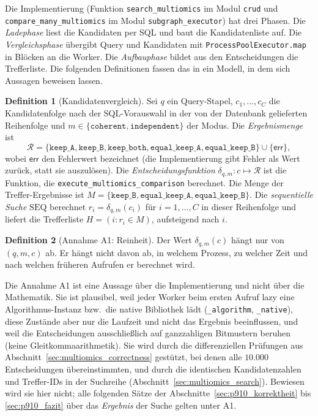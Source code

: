 \documentclass[a4paper,12pt, twoside]{report}
\theoremstyle{definition}
\newtheorem{definition}{Definition}
\begin{document}
Die Implementierung (Funktion \texttt{search\_multiomics} im Modul \texttt{crud} und \texttt{compare\_many\_multiomics} im Modul \texttt{subgraph\_executor}) hat drei Phasen. Die \emph{Ladephase} liest die Kandidaten per SQL und baut die Kandidatenliste auf. Die \emph{Vergleichsphase} übergibt Query und Kandidaten mit \texttt{ProcessPoolExecutor.map} in Blöcken an die Worker. Die \emph{Aufbauphase} bildet aus den Entscheidungen die Trefferliste. Die folgenden Definitionen fassen das in ein Modell, in dem sich Aussagen beweisen lassen.

\begin{definition}[Kandidatenvergleich]
\label{def:p910_aufgabe}
Sei $q$ ein Query-Stapel, $c_1,\dots,c_C$ die Kandidatenfolge nach der SQL-Vorauswahl in der von der Datenbank gelieferten Reihenfolge und $m\in\{\texttt{coherent},\texttt{independent}\}$ der Modus. Die \emph{Ergebnismenge} ist
\[
\mathcal R=\{\texttt{keep\_A},\texttt{keep\_B},\texttt{keep\_both},\texttt{equal\_keep\_A},\texttt{equal\_keep\_B}\}\cup\{\mathsf{err}\},
\]
wobei $\mathsf{err}$ den Fehlerwert bezeichnet (die Implementierung gibt Fehler als Wert zurück, statt sie auszulösen). Die \emph{Entscheidungsfunktion} $\delta_{q,m}\colon c\mapsto\mathcal R$ ist die Funktion, die \texttt{execute\_multiomics\_comparison} berechnet. Die Menge der Treffer-Ergebnisse ist $M=\{\texttt{keep\_B},\texttt{equal\_keep\_A},\texttt{equal\_keep\_B}\}$. Die \emph{sequentielle Suche} $\mathrm{SEQ}$ berechnet $r_i=\delta_{q,m}(c_i)$ für $i=1,\dots,C$ in dieser Reihenfolge und liefert die Trefferliste $H=(i : r_i\in M)$, aufsteigend nach $i$.
\end{definition}

\begin{definition}[Annahme A1: Reinheit]
\label{def:p910_reinheit}
Der Wert $\delta_{q,m}(c)$ hängt nur von $(q,m,c)$ ab. Er hängt nicht davon ab, in welchem Prozess, zu welcher Zeit und nach welchen früheren Aufrufen er berechnet wird.
\end{definition}

Die Annahme A1 ist eine Aussage über die Implementierung und nicht über die Mathematik. Sie ist plausibel, weil jeder Worker beim ersten Aufruf lazy eine Algorithmus-Instanz bzw.\ die native Bibliothek lädt (\texttt{\_algorithm}, \texttt{\_native}), diese Zustände aber nur die Laufzeit und nicht das Ergebnis beeinflussen, und weil die Entscheidungen ausschließlich auf ganzzahligen Bitmustern beruhen (keine Gleitkommaarithmetik). Sie wird durch die differenziellen Prüfungen aus Abschnitt~\ref{sec:multiomics_correctness} gestützt, bei denen alle $10.000$ Entscheidungen übereinstimmten, und durch die identischen Kandidatenzahlen und Treffer-IDs in der Suchreihe (Abschnitt~\ref{sec:multiomics_search}). Bewiesen wird sie hier nicht; alle folgenden Sätze der Abschnitte~\ref{sec:p910_korrektheit} bis \ref{sec:p910_fazit} über das \emph{Ergebnis} der Suche gelten unter A1.
\end{document}
